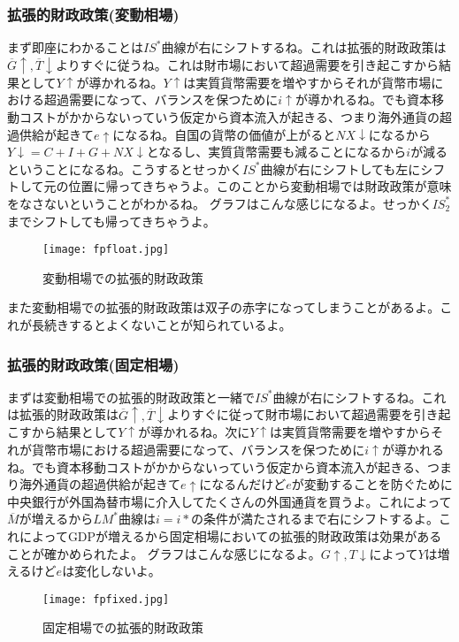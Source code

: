 \documentclass[a4paper, 12pt]{article}
\begin{document}
\subsubsection{拡張的財政政策(変動相場)}
まず即座にわかることは$IS^*$曲線が右にシフトするね。これは拡張的財政政策は$\overline{G} \uparrow, \overline{T} \downarrow$よりすぐに従うね。これは財市場において超過需要を引き起こすから結果として$Y \uparrow$が導かれるね。$Y \uparrow$は実質貨幣需要を増やすからそれが貨幣市場における超過需要になって、バランスを保つために$i\uparrow$が導かれるね。でも資本移動コストがかからないっていう仮定から資本流入が起きる、つまり海外通貨の超過供給が起きて$e \uparrow$になるね。自国の貨幣の価値が上がると$NX\downarrow$になるから$Y\downarrow = C+I+G+NX\downarrow$となるし、実質貨幣需要も減ることになるから$i$が減るということになるね。こうするとせっかく$IS^*$曲線が右にシフトしても左にシフトして元の位置に帰ってきちゃうよ。このことから変動相場では財政政策が意味をなさないということがわかるね。
グラフはこんな感じになるよ。せっかく$IS_2^*$までシフトしても帰ってきちゃうよ。
\begin{figure}[h]
\begin{center}
\texttt{[image: fpfloat.jpg]}
\caption{変動相場での拡張的財政政策}
\label{}
\end{center}
\end{figure}

また変動相場での拡張的財政政策は双子の赤字になってしまうことがあるよ。これが長続きするとよくないことが知られているよ。
\subsubsection{拡張的財政政策(固定相場)}
まずは変動相場での拡張的財政政策と一緒で$IS^*$曲線が右にシフトするね。これは拡張的財政政策は$\overline{G} \uparrow, \overline{T} \downarrow$よりすぐに従って財市場において超過需要を引き起こすから結果として$Y \uparrow$が導かれるね。次に$Y \uparrow$は実質貨幣需要を増やすからそれが貨幣市場における超過需要になって、バランスを保つために$i\uparrow$が導かれるね。でも資本移動コストがかからないっていう仮定から資本流入が起きる、つまり海外通貨の超過供給が起きて$e \uparrow$になるんだけど$e$が変動することを防ぐために中央銀行が外国為替市場に介入してたくさんの外国通貨を買うよ。これによって$\overline{M}$が増えるから$LM^*$曲線は$i=i*$の条件が満たされるまで右にシフトするよ。これによってGDPが増えるから固定相場においての拡張的財政政策は効果があることが確かめられたよ。
グラフはこんな感じになるよ。$G\uparrow, T\downarrow$によって$Y$は増えるけど$e$は変化しないよ。
\begin{figure}[h]
\begin{center}
\texttt{[image: fpfixed.jpg]}
\caption{固定相場での拡張的財政政策}
\label{}
\end{center}
\end{figure}
\end{document}
